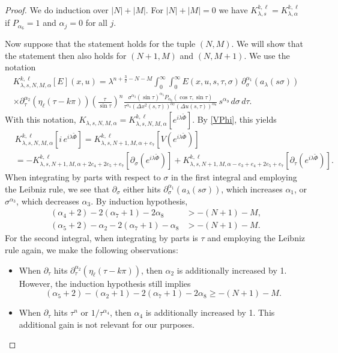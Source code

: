 \documentclass[leqno]{amsart}
\theoremstyle{definition}
\theoremstyle{remark}
\numberwithin{equation}{section}
\begin{document}
\begin{proof}
We do induction over $|N| + |M|$. For $|N| + |M| = 0$ we have $K_{\lambda,s}^{k,\ell} = K_{\lambda,\alpha}^{k,\ell}$ if $P_{\alpha_6} = 1$ and $\alpha_j = 0$ for all $j$.

 Now suppose that the statement holds for the tuple $(N,M)$. We will show that the statement then also holds for $(N + 1,M)$ and $(N,M + 1)$. We use the notation
\begin{multline*}
K_{\lambda,s,N,M,\alpha}^{k,\ell}[E](x, u)
 = \lambda^{n + \frac{3}{2}-N-M} \int_0^\infty \int_0^\infty E(x,u,s,\tau,\sigma) \, \partial_\sigma^{\alpha_1} (a_{\lambda}(s \sigma)) \\
 \times \partial_\tau^{\alpha_2}(\eta_\ell(\tau-k \pi))
 \left(\frac{\tau}{\sin \tau}\right)^{n} \frac{\sigma^{\alpha_3} \left(\sin \tau\right)^{\alpha_5} P_{\alpha_6}(\cos\tau,\sin\tau)}{ \tau^{\alpha_ 4 } \left( \Delta x^2 (s,\tau) \right)^{\alpha_7}\left( \Delta u(s,\tau) \right)^{\alpha_8} } \, s^{\alpha_9} \, d\sigma \, d \tau.
\end{multline*}
With this notation, $K_{\lambda,s,N,M,\alpha} = K_{\lambda,s,N,M,\alpha}^{k,\ell}[e^{i\lambda \tilde \Phi}]$.
 By \eqref{VPhi}, this yields
\begin{align*}
& K_{\lambda,s,N,M,\alpha}^{k,\ell}[i\,e^{i\lambda \tilde \Phi}]
 = K_{\lambda,s,N + 1,M,\alpha + e_7}^{k,\ell}[V(e^{i\lambda \tilde \Phi})] \\ 
& = -K_{\lambda,s,N + 1,M,\alpha + 2e_ 4 + 2e_5 + e_7}^{k,\ell}[\partial_\sigma(e^{i\lambda \tilde \Phi})] + K_{\lambda,s,N + 1,M,\alpha-e_3 + e_ 4 + 2e_5 + e_7}^{k,\ell}[\partial_\tau(e^{i\lambda \tilde \Phi})].
\end{align*}
When integrating by parts  with respect to $\sigma$ in the first integral and employing the Leibniz  rule, we see that $\partial_\sigma$ either hits $\partial_\sigma^{\alpha_1} (a_{\lambda}(s \sigma))$, which increases $\alpha_1$, or $\sigma^{\alpha_3}$, which decreases $\alpha_3$. By induction hypothesis,
\begin{align*}
(\alpha_ 4 + 2)-2(\alpha_7 + 1)-2\alpha_8 & > -(N + 1)-M, \\
(\alpha_5 + 2)-\alpha_2-2(\alpha_7 + 1)-\alpha_8 & > -(N + 1)-M.
\end{align*}
For the second integral, when  integrating  by parts is $\tau$ and  employing the Leibniz   rule again, we make the following observations:
\begin{itemize}
\item[(i)] When $\partial_\tau$ hits $\partial_\tau^{\alpha_2}(\eta_\ell(\tau-k \pi))$, then $\alpha_2$ is additionally increased by 1. However, the induction hypothesis still implies
\[
(\alpha_5 + 2)-(\alpha_2 + 1)-2(\alpha_7 + 1)-2\alpha_8 \ge -(N + 1)-M.
\]
\item[(ii)] When $\partial_\tau$ hits $\tau^{n}$ or $1/\tau^{\alpha_ 4 }$, then $\alpha_ 4 $ is additionally increased by 1. This additional gain is not relevant for our purposes.


\end{itemize}
\end{proof}
\end{document}
